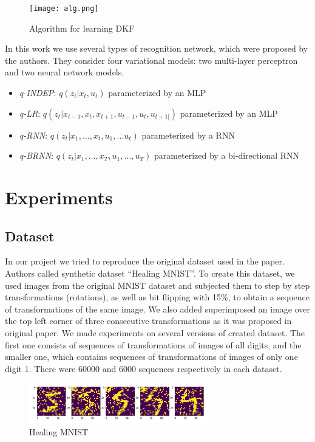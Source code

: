 \documentclass{article}
\begin{document}
\begin{figure}[h]
\centering
\texttt{[image: alg.png]}
\caption{Algorithm for learning DKF}
\label{fig:alg}
\end{figure}

In this work we use several types of recognition network, which were proposed by the authors. They consider four variational models: two multi-layer perceptron
and two neural network models. 

\begin{itemize}
   \item \emph{q-INDEP}: $q(z_t |x_t , u_t )$ parameterized by an MLP
   \item \emph{q-LR}: $q(z_t |x_{t-1} , x_t , x_{t+1} , u_{t-1} , u_t , u_{t+1]} ) $ parameterized by an MLP
   \item \emph{q-RNN}: $q(z_t |x_1 , \dots , x_t , u_1 , \dots u_t )$ parameterized by a RNN
   \item \emph{q-BRNN}: $q(z_t |x_1 , \dots , x_T , u_1 , \dots , u_T )$ parameterized by a bi-directional RNN
\end{itemize}


\section{Experiments}

\subsection{Dataset}

In our project we tried to reproduce the original dataset used in the paper. Authors called synthetic dataset “Healing MNIST”. To create this dataset, we used images from the original MNIST
dataset and subjected them to step by step transformations (rotations), as well as bit flipping with 15\%, to obtain a sequence of transformations of the same image. We also added  superimposed an image over the top left corner of three consecutive transformations as it was proposed in original paper. 
We made experiments on several versions of created dataset. The first one consists of sequences of transformations of images of all digits, and the smaller one, which contains sequences of transformations of images of only one digit 1. There were 60000 and 6000 sequences respectively in each dataset.

\begin{figure}[h]
\centering
\includegraphics[width=0.7\textwidth]{mnist.png}
\caption{Healing MNIST}
\label{fig:data}
\end{figure}
\end{document}
